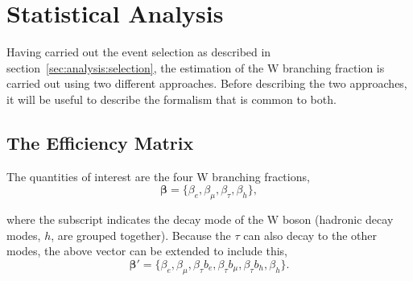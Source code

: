 \section{Statistical Analysis}
\label{sec:analysis:method}



Having carried out the event selection as described in
section~\ref{sec:analysis:selection}, the estimation of the W branching fraction
is carried out using two different approaches.  Before describing the
two approaches, it will be useful to describe the formalism that is
common to both.



\subsection{The Efficiency Matrix}


The quantities of interest are the four W branching fractions,
\begin{equation}
    \boldsymbol{\beta} = \{\beta_{e}, \beta_{\mu}, \beta_{\tau}, \beta_{h}\},
\end{equation}

\noindent
where the subscript indicates the decay mode of the W boson (hadronic
decay modes, $h$, are grouped together).  Because the $\tau$ can also
decay to the other modes, the above vector can be extended to include
this,
\begin{equation}
    \boldsymbol{\beta'} = \{\beta_{e}, \beta_{\mu}, \beta_{\tau}b_{e},
    \beta_{\tau}b_{\mu}, \beta_{\tau}b_{h}, \beta_{h}\}.
\end{equation}


